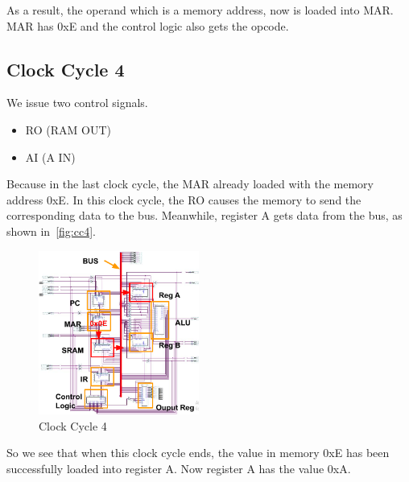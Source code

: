 As a result, the operand which is a memory address, now is loaded into MAR. MAR has 0xE and the control logic also gets the opcode.


\subsection{Clock Cycle 4}

We issue two control signals.

\begin{itemize}
	\item RO (RAM OUT)
	\item AI (A IN)
\end{itemize}

Because in the last clock cycle, the MAR already loaded with the memory address 0xE. In this clock cycle, the RO causes the memory to send the corresponding data to the bus. Meanwhile, register A gets data from the bus, as shown in~\autoref{fig:cc4}.

\begin{figure}[th]
	\includegraphics[width=0.47\textwidth]{figures/cc4}
	\centering
	\caption{Clock Cycle 4}
	\label{fig:cc4}
\end{figure}

So we see that when this clock cycle ends, the value in memory 0xE has been successfully loaded into register A. Now register A has the value 0xA.
